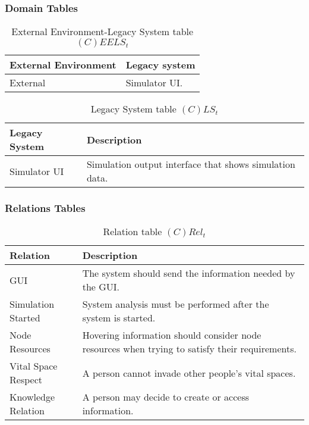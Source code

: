 \subsubsection{Domain Tables}

\begin{table}[H]
	\centering
	\begin{tabular}{|p{4cm}|p{8cm}|}
			\hline
			\textbf{External Environment} & \textbf{Legacy system} \\
			\hline
			External & Simulator UI. \\
			\hline
		\end{tabular}
	\caption{External Environment-Legacy System table $(C)EELS_t$}
	\label{tab:ceelst}
\end{table}

\begin{table}[H]
	\centering
	\begin{tabular}{|p{4cm}|p{8cm}|}
			\hline
			\textbf{Legacy System} & \textbf{Description} \\
			\hline
			Simulator UI & Simulation output interface that shows simulation data. \\
			\hline
		\end{tabular}
	\caption{Legacy System table $(C)LS_t$}
	\label{tab:clst}
\end{table}

\subsubsection{Relations Tables}

\begin{table}[H]
	\centering
	\begin{tabular}{|p{4cm}|p{8cm}|}
			\hline
			\textbf{Relation} & \textbf{Description} \\
			\hline
			GUI & The system should send the information needed by the GUI. \\
			\hline
			Simulation Started & System analysis must be performed after the system
			is started. \\
			\hline
			Node Resources & Hovering information should consider node resources when
			trying to satisfy their requirements. \\
			\hline
			Vital Space Respect & A person cannot invade other people's vital spaces. \\
			\hline
			Knowledge Relation & A person may decide to create or access information. \\
			\hline
		\end{tabular}
	\caption{Relation table $(C)Rel_t$}
	\label{tab:crelt}
\end{table}


